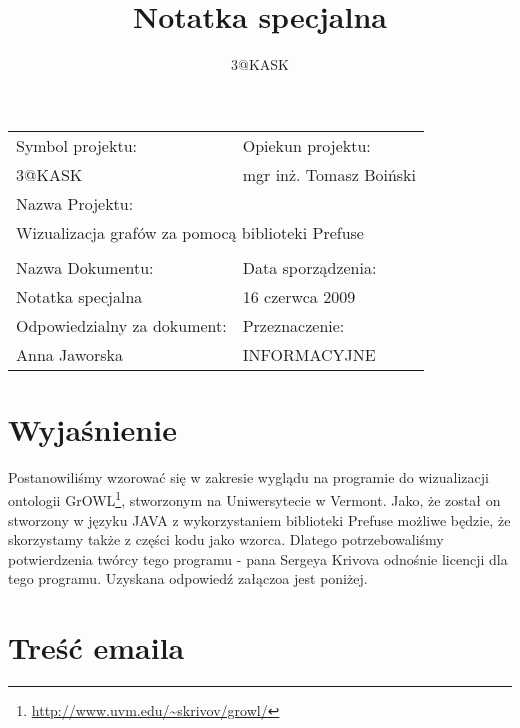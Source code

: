 \documentclass[a4paper,10pt]{article}
\title{Notatka specjalna}
\author{3@KASK}
\begin{document}



\maketitle


\begin{center}
\begin{tabular}{|p{7cm}|p{7cm}|}
\hline
Symbol projektu: & Opiekun projektu:   \tabularnewline 
3@KASK & mgr inż. Tomasz Boiński    \tabularnewline \hline
\multicolumn{2}{|l|}{Nazwa Projektu: } \tabularnewline
\multicolumn{2}{|l|}{Wizualizacja grafów za pomocą biblioteki Prefuse } \tabularnewline 
\hline
\multicolumn{2}{l}{ } \tabularnewline %
\hline 
Nazwa Dokumentu: & Data sporządzenia:   \tabularnewline 
Notatka specjalna & 16 czerwca 2009 \tabularnewline \hline
Odpowiedzialny za dokument: & Przeznaczenie:   \tabularnewline 
Anna Jaworska & INFORMACYJNE \tabularnewline \hline
\end{tabular}
\end{center}



\section{Wyjaśnienie}
Postanowiliśmy wzorować się w zakresie wyglądu na programie do wizualizacji ontologii  GrOWL\footnote{\url{http://www.uvm.edu/~skrivov/growl/}}, stworzonym na Uniwersytecie w Vermont. Jako, że został on stworzony w języku JAVA z wykorzystaniem biblioteki Prefuse możliwe będzie, że skorzystamy także z części kodu jako wzorca. Dlatego potrzebowaliśmy potwierdzenia twórcy tego programu - pana Sergeya Krivova odnośnie licencji dla tego programu. Uzyskana odpowiedź załączoa jest poniżej.


\section{Treść emaila}
\end{document}
